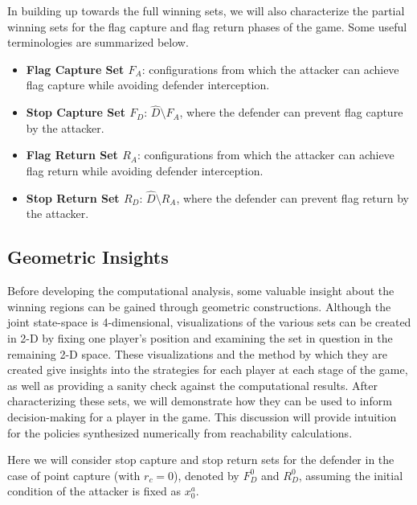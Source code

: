 \documentclass[letterpaper, 10 pt, conference]{ieeeconf}  %
\numberwithin{algorithm}{section}
\begin{document}
In building up towards the full winning sets, we will also characterize the partial winning sets for the flag capture and flag return phases of the game.  Some useful terminologies are summarized below.
\begin{itemize}
\item{{\bf Flag Capture Set $F_A$}: configurations from which the attacker can achieve flag capture while avoiding defender interception.}
\item{ {\bf Stop Capture Set $F_D$}: $\hat{D} \setminus F_A$, where the defender can prevent flag capture by the attacker.}
\item{ {\bf Flag Return Set $R_A$}: configurations from which the attacker can achieve flag return while avoiding defender interception.} 
\item{ {\bf Stop Return Set $R_D$}: $\hat{D} \setminus R_A$, where the defender can prevent flag return by the attacker.}
\end{itemize}


\subsection{Geometric Insights}
\label{sub:geometric}
Before developing the computational analysis, some valuable insight about the winning regions can be gained through geometric constructions.  Although the joint state-space is 4-dimensional, visualizations of the various sets can be created in 2-D by fixing one player's position and examining the set in question in the remaining 2-D space.  These visualizations and the method by which they are created give insights into the strategies for each player at each stage of the game, as well as providing a sanity check against the computational results.  After characterizing these sets, we will demonstrate how they can be used to inform decision-making for a player in the game.  This discussion will provide intuition for the policies synthesized numerically from reachability calculations.

Here we will consider stop capture and stop return sets for the defender in the case of point capture (with $r_c =0$), denoted by $F_D^0$ and $R_D^0$, assuming the initial condition of the attacker is fixed as $x^a_0$.  
\end{document}
